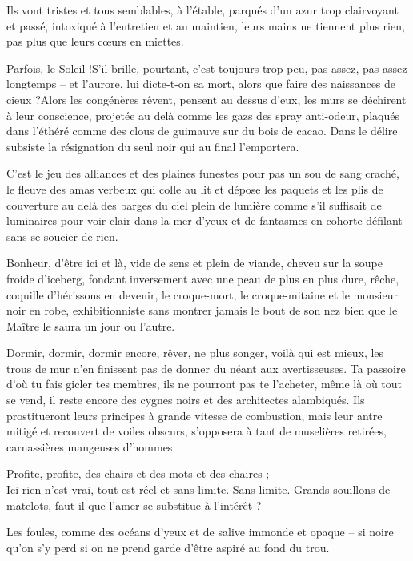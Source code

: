  Ils vont  tristes et  tous semblables,  à l'étable,  parqués d'un  azur trop
  clairvoyant et passé, intoxiqué à l'entretien et au maintien, leurs mains ne
  tiennent plus rien, pas plus que leurs cœurs en miettes.

  Parfois, le Soleil !S'il brille, pourtant,  c'est toujours trop peu, pas assez,
  pas assez  longtemps – et l'aurore,  lui dicte-t-on sa mort,  alors que faire
  des  naissances de  cieux ?Alors  les congénères  rêvent, pensent  au dessus
  d'eux, les murs se déchirent à  leur conscience, projetée au delà comme les
  gazs  des  spray anti-odeur,  plaqués  dans  l'éthéré  comme des  clous  de
  guimauve sur du bois de cacao. Dans le délire subsiste la résignation du seul
  noir qui au final l'emportera.

  C'est le  jeu des alliances  et des  plaines funestes pour  pas un sou  de sang
  craché, le fleuve des amas verbeux qui  colle au lit et dépose les paquets et
  les plis de couverture au delà des barges du ciel plein de lumière comme s'il
  suffisait de luminaires pour  voir clair dans la mer d'yeux  et de fantasmes en
  cohorte défilant sans se soucier de rien.

  Bonheur, d'être  ici et là, vide  de sens et  plein de viande, cheveu  sur la
  soupe froide d'iceberg, fondant inversement avec une peau de plus en plus dure,
  rêche, coquille d'hérissons en devenir,  le croque-mort, le croque-mitaine et
  le monsieur  noir en robe, exhibitionniste  sans montrer jamais le  bout de son
  nez bien que le Maître le saura un jour ou l'autre.

  Dormir, dormir,  dormir encore, rêver, ne  plus songer, voilà qui  est mieux,
  les trous de mur  n'en finissent pas de donner du  néant aux avertisseuses. Ta
  passoire d'où  tu fais gicler tes  membres, ils ne pourront  pas te l'acheter,
  même là où tout se vend, il reste encore des cygnes noirs et des architectes
  alambiqués. Ils prostitueront leurs principes à grande vitesse de combustion,
  mais leur antre  mitigé et recouvert de voiles obscurs,  s'opposera à tant de
  muselières retirées, carnassières mangeuses d'hommes.

  Profite, profite, des chairs et des mots et des chaires ;\\
  Ici rien n'est vrai, tout est réel et sans limite. Sans limite.
  Grands souillons de matelots, faut-il que l'amer se substitue à l'intérêt ?

  Les foules,  comme des  océans d'yeux et  de salive immonde  et opaque  – si
  noire qu'on s'y perd si on ne prend garde d'être aspiré au fond du trou.

